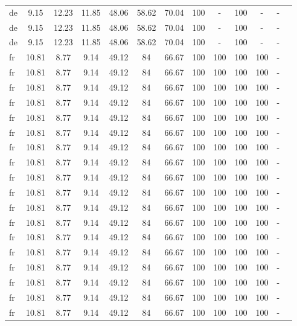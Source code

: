 \begin{table}[H]
\begin{tabularx}{\textwidth}{Xcccccccccccc}
            de & 9.15 & 12.23 & 11.85 & 48.06 & 58.62 & 70.04 & 100 & - & 100 & - & - \\
            de & 9.15 & 12.23 & 11.85 & 48.06 & 58.62 & 70.04 & 100 & - & 100 & - & - \\
            de & 9.15 & 12.23 & 11.85 & 48.06 & 58.62 & 70.04 & 100 & - & 100 & - & - \\
            fr & 10.81 & 8.77 & 9.14 & 49.12 & 84 & 66.67 & 100 & 100 & 100 & 100 & - \\
            fr & 10.81 & 8.77 & 9.14 & 49.12 & 84 & 66.67 & 100 & 100 & 100 & 100 & - \\
            fr & 10.81 & 8.77 & 9.14 & 49.12 & 84 & 66.67 & 100 & 100 & 100 & 100 & - \\
            fr & 10.81 & 8.77 & 9.14 & 49.12 & 84 & 66.67 & 100 & 100 & 100 & 100 & - \\
            fr & 10.81 & 8.77 & 9.14 & 49.12 & 84 & 66.67 & 100 & 100 & 100 & 100 & - \\
            fr & 10.81 & 8.77 & 9.14 & 49.12 & 84 & 66.67 & 100 & 100 & 100 & 100 & - \\
            fr & 10.81 & 8.77 & 9.14 & 49.12 & 84 & 66.67 & 100 & 100 & 100 & 100 & - \\
            fr & 10.81 & 8.77 & 9.14 & 49.12 & 84 & 66.67 & 100 & 100 & 100 & 100 & - \\
            fr & 10.81 & 8.77 & 9.14 & 49.12 & 84 & 66.67 & 100 & 100 & 100 & 100 & - \\
            fr & 10.81 & 8.77 & 9.14 & 49.12 & 84 & 66.67 & 100 & 100 & 100 & 100 & - \\
            fr & 10.81 & 8.77 & 9.14 & 49.12 & 84 & 66.67 & 100 & 100 & 100 & 100 & - \\
            fr & 10.81 & 8.77 & 9.14 & 49.12 & 84 & 66.67 & 100 & 100 & 100 & 100 & - \\
            fr & 10.81 & 8.77 & 9.14 & 49.12 & 84 & 66.67 & 100 & 100 & 100 & 100 & - \\
            fr & 10.81 & 8.77 & 9.14 & 49.12 & 84 & 66.67 & 100 & 100 & 100 & 100 & - \\
            fr & 10.81 & 8.77 & 9.14 & 49.12 & 84 & 66.67 & 100 & 100 & 100 & 100 & - \\
            fr & 10.81 & 8.77 & 9.14 & 49.12 & 84 & 66.67 & 100 & 100 & 100 & 100 & - \\
            fr & 10.81 & 8.77 & 9.14 & 49.12 & 84 & 66.67 & 100 & 100 & 100 & 100 & - \\
            fr & 10.81 & 8.77 & 9.14 & 49.12 & 84 & 66.67 & 100 & 100 & 100 & 100 & - \\

\end{tabularx}
\end{table}
